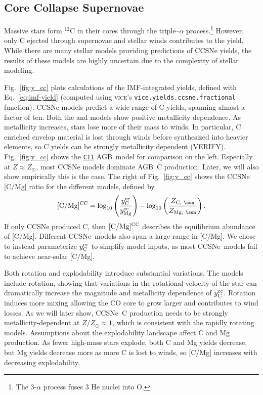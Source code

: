 \documentclass[fleqn,usenatbib]{mnras}
\newcommand{\VICE}{\textsc{vice}}
\newcommand{\cxi}{\texttt{\hyperlink{C11}{C11}}}
\newcommand{\agb}{AGB}
\newcommand{\cc}{CCSNe}
\newcommand{\imf}{IMF}
\newcommand{\Ycc}{\ensuremath{y_{\rm C}^{\rm cc}}}
\newcommand{\Yoc}{\ensuremath{y_{\rm Mg}^{\rm cc}}}
\begin{document}
\subsection{Core Collapse Supernovae}


Massive stars form $^{12}$C in their cores through the triple--$\alpha$ process.\footnote{The 3-$\alpha$ process fuses 3 He nuclei into O.} 
However, only C ejected through supernovae and stellar winds contributes to the yield. 
While there are many stellar models providing predictions of \cc{} yields, the results of these models are highly uncertain due to the complexity of stellar modeling.

Fig.~\ref{fig:y_cc} plots calculations of the \imf-integrated yields, defined with Eq.~\ref{eq:imf-yield} (computed using \VICE's \texttt{vice.yields.ccsne.fractional} function). 
\cc{} models predict a wide range of C yields, spanning almost a factor of ten. 
Both the \citet{NKT13} and \cite{LC18} models show positive metallicity dependence. 
As metallicity increases, stars lose more of their mass to winds. In particular, C enriched envelop material is lost through winds before synthesized into heavier elements, so C yields can be strongly metallicity dependent (VERIFY).
Fig.~\ref{fig:y_cc} shows the \cxi{} \agb\ model for comparison on the left. Especially at $Z\approx Z_\odot$, most \cc{} models dominate \agb\ C production. Later, we will also show empirically this is the case.
The right of Fig.~\ref{fig:y_cc} shows the \cc{} [C/Mg] ratio for the different models, defined by
\begin{equation}\label{eq:c_mg_cc}
    {\rm [C/Mg]^{CC}} = \log_{10}\left( \frac{\Ycc}{\Yoc}\right) - \log_{10} \left( \frac{Z_{{\rm C},\ \sun }}{Z_{{\rm Mg},\ \sun }} \right).
\end{equation}
If only \cc{} produced C, then ${\rm [C/Mg]^{CC}}$ describes the equilibrium abundance of [C/Mg].
Different \cc\ models also span a large range in [C/Mg]. 
We chose to instead parameterize $\Ycc$ to simplify model inputs, as most \cc\ models fail to achieve near-solar [C/Mg].

Both rotation and explodability introduce substantial variations. The \cite{LC18} models include rotation, showing that variations in the rotational velocity of the star can dramatically increase the magnitude and metallicity dependence of $\Ycc$. Rotation induces more mixing allowing the CO core to grow larger and contributes to wind losses. As we will later show, \cc\ C production needs to be strongly metallicity-dependent at $Z/Z_\odot \approx 1$, which is consistent with the \cite{LC18} rapidly rotating models.
Assumptions about the explodability landscape affect C and Mg production. As fewer high-mass stars explode, both C and Mg yields decrease, but Mg yields decrease more as more C is lost to winds, so [C/Mg] increases with decreasing explodability. 
\end{document}
